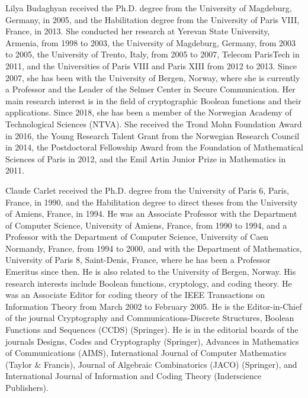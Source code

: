 \documentclass[10pt]{article}
\begin{document}
Lilya Budaghyan received the Ph.D. degree from the University of Magdeburg, Germany, in 2005, and the Habilitation degree from the University of Paris VIII, France, in 2013. She conducted her research at Yerevan State University, Armenia, from 1998 to 2003, the University of Magdeburg, Germany, from 2003 to 2005, the University of Trento, Italy, from 2005 to 2007, Telecom ParisTech in 2011, and the Universities of Paris VIII and Paris XIII from 2012 to 2013. Since 2007, she has been with the University of Bergen, Norway, where she is currently a Professor and the Leader of the Selmer Center in Secure Communication. Her main research interest is in the field of cryptographic Boolean functions and their applications. Since 2018, she has been a member of the Norwegian Academy of Technological Sciences (NTVA). She received the Trond Mohn Foundation Award in 2016, the Young Research Talent Grant from the Norwegian Research Council in 2014, the Postdoctoral Fellowship Award from the Foundation of Mathematical Sciences of Paris in 2012, and the Emil Artin Junior Prize in Mathematics in 2011.

Claude Carlet received the Ph.D. degree from the University of Paris 6, Paris, France, in 1990, and the Habilitation degree to direct theses from the University of Amiens, France, in 1994. He was an Associate Professor with the Department of Computer Science, University of Amiens, France, from 1990 to 1994, and a Professor with the Department of Computer Science, University of Caen Normandy, France, from 1994 to 2000, and with the Department of Mathematics, University of Paris 8, Saint-Denis, France, where he has been a Professor Emeritus since then. He is also related to the University of Bergen, Norway. His research interests include Boolean functions, cryptology, and coding theory. He was an Associate Editor for coding theory of the IEEE Transactions on Information Theory from March 2002 to February 2005. He is the Editor-in-Chief of the journal Cryptography and Communications-Discrete Structures, Boolean Functions and Sequences (CCDS) (Springer). He is in the editorial boards of the journals Designs, Codes and Cryptography (Springer), Advances in Mathematics of Communications (AIMS), International Journal of Computer Mathematics (Taylor \& Francis), Journal of Algebraic Combinatorics (JACO) (Springer), and International Journal of Information and Coding Theory (Inderscience Publishers).
\end{document}
